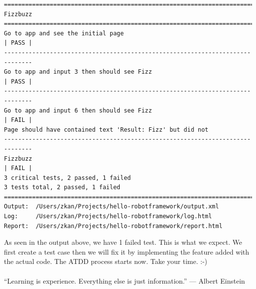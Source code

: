 \documentclass{article}
\begin{document}
\begin{verbatim}
==============================================================================
Fizzbuzz
==============================================================================
Go to app and see the initial page                                    | PASS |
------------------------------------------------------------------------------
Go to app and input 3 then should see Fizz                            | PASS |
------------------------------------------------------------------------------
Go to app and input 6 then should see Fizz                            | FAIL |
Page should have contained text 'Result: Fizz' but did not
------------------------------------------------------------------------------
Fizzbuzz                                                              | FAIL |
3 critical tests, 2 passed, 1 failed
3 tests total, 2 passed, 1 failed
==============================================================================
Output:  /Users/zkan/Projects/hello-robotframework/output.xml
Log:     /Users/zkan/Projects/hello-robotframework/log.html
Report:  /Users/zkan/Projects/hello-robotframework/report.html
\end{verbatim}

\noindent As seen in the output above, we have 1 failed test. This is what we
expect. We first create a test case then we will fix it by implementing the
feature added with the actual code. The ATDD process starts now. Take your
time. :-) \\\\

\noindent ``Learning is experience. Everything else is just information.'' ---
Albert Einstein
\end{document}
